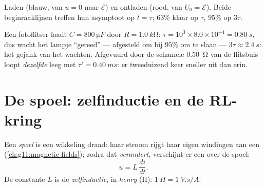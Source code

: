 \begin{omfigure}

{\small Laden (blauw, van $u = 0$ naar $\mathcal{E}$) en ontladen (rood, van
$U_0 = \mathcal{E}$). Beide beginraaklijnen treffen hun asymptoot op
$t = \tau$; $63\%$ klaar op $\tau$, $95\%$ op $3\tau$.}
\end{omfigure}

\begin{example}\label{ex:g12:rc-rl-circuits:flashrc}
Een fotoflitser laadt $C = \qty{800}{\micro F}$ door
$R = \qty{1.0}{k\ohm}$: $\tau = 10^3 \times 8.0\times10^{-4} =
\qty{0.80}{s}$, dus wacht het lampje ``gereed'' --- afgesteld om bij $95\%$
om te slaan --- $3\tau \approx \qty{2.4}{s}$: het gejank van het wachten.
Afgevuurd door de schamele \qty{0.50}{\ohm} van de flitsbuis loopt
\emph{dezelfde}  leeg met $\tau' = \qty{0.40}{ms}$: er tweeduizend
keer sneller uit dan erin.
\end{example}

\section{De spoel: zelfinductie en de RL-kring}

\begin{definition}\label{def:g12:rc-rl-circuits:inductor}
Een \emph{spoel} is een wikkeling draad: haar stroom rijgt haar
eigen windingen aan een 
(\cref{ch:g11:magnetic-fields}); zodra dat \emph{verandert}, verschijnt er een
 over de spoel:
\[
u = L\,\frac{di}{dt} .
\]
De constante $L$ is de \emph{zelfinductie}, in
\emph{henry} (\unit{H}): $\qty{1}{H} = \qty{1}{V.s/A}$.
\end{definition}
\admitted

